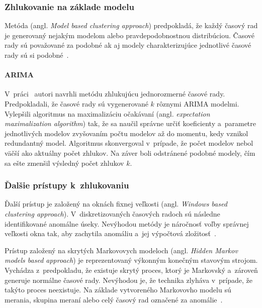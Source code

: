 \documentclass[a4paper,twoside,slovak,12pt,appendix]{article}
\begin{document}
\subsubsection{Zhlukovanie na základe modelu}
Metóda (angl. \textit{Model based clustering approach}) predpokladá, že každý
časový rad je generovaný nejakým modelom alebo pravdepodobnostnou distribúciou.
Časové rady sú považované za podobné ak aj modely charakterizujúce jednotlivé
časové rady sú si podobné~\cite{Rani2012}.

\paragraph{ARIMA}
V~práci~\cite{Xiong2002} autori navrhli metódu zhlukujúcu jednorozmerné časové
rady. Predpokladali, že časové rady sú vygenerované $k$ rôznymi ARIMA modelmi.
Vylepšili algoritmus na maximalizáciu očakávaní (angl. \textit{expectation
maximalization algorithm}) tak, že sa naučil správne určiť koeficienty
a~parametre jednotlivých modelov zvyšovaním počtu modelov až do momentu, kedy
vznikol redundantný model. Algoritmus skonvergoval v~prípade, že počet modelov
nebol väčší ako aktuálny počet zhlukov. Na záver boli odstránené podobné modely,
čím sa ešte zmenšil výsledný počet zhlukov $k$.

\subsubsection{Ďalšie prístupy k~zhlukovaniu}
Ďalší prístup je založený na oknách fixnej veľkosti (angl. \textit{Windows based
clustering approach}). V~diskretizovaných časových radoch sú následne
identifikované anomálne úseky. Nevýhodou metódy je náročnosť voľby správnej
veľkosti okna tak, aby zachytila anomáliu a~jej výpočtová
zložitosť~\cite{Teng2010}.

Prístup založený na skrytých Markovovych modeloch (angl. \textit{Hidden Markov
models based approach}) je reprezentovaný výkonným konečným stavovým strojom.
Vychádza z~predpokladu, že existuje skrytý proces, ktorý je Markovský a~zároveň
generuje normálne časové rady. Nevýhodou je, že technika zlyháva v~prípade, že
takýto proces neexistuje. Na základe vytvoreného Markovovho modelu sú merania,
skupina meraní alebo celý časový rad označené za anomálie~\cite{Teng2010}.

\end{document}
